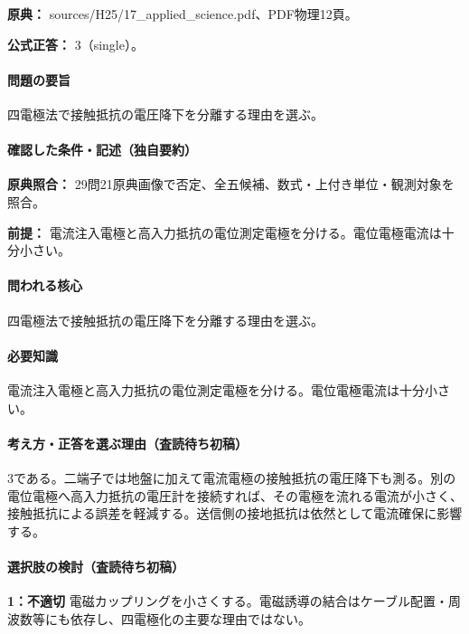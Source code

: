 \noindent\textbf{原典：} sources/H25/17\_applied\_science.pdf、PDF物理12頁。

\textbf{公式正答：} 3（single）。

\paragraph{問題の要旨} 四電極法で接触抵抗の電圧降下を分離する理由を選ぶ。

\paragraph{確認した条件・記述（独自要約）}\mbox{}\par

\noindent\textbf{原典照合：} 29問21原典画像で否定、全五候補、数式・上付き単位・観測対象を照合。\par

\noindent\textbf{前提：} 電流注入電極と高入力抵抗の電位測定電極を分ける。電位電極電流は十分小さい。\par

\paragraph{問われる核心} 四電極法で接触抵抗の電圧降下を分離する理由を選ぶ。

\paragraph{必要知識} 電流注入電極と高入力抵抗の電位測定電極を分ける。電位電極電流は十分小さい。

\paragraph{考え方・正答を選ぶ理由（査読待ち初稿）} 3である。二端子では地盤に加えて電流電極の接触抵抗の電圧降下も測る。別の電位電極へ高入力抵抗の電圧計を接続すれば、その電極を流れる電流が小さく、接触抵抗による誤差を軽減する。送信側の接地抵抗は依然として電流確保に影響する。

\paragraph{選択肢の検討（査読待ち初稿）}\mbox{}\par

\noindent\textbf{1：不適切} 電磁カップリングを小さくする。電磁誘導の結合はケーブル配置・周波数等にも依存し、四電極化の主要な理由ではない。\par

